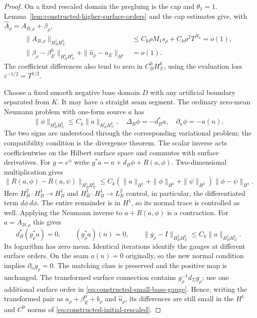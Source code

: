 \documentclass[11pt]{amsart}
\theoremstyle{definition}
\theoremstyle{remark}
\theoremstyle{plain}
\begin{document}
\begin{proof}
On a fixed rescaled domain the pregluing is the cap and $\theta_1=1$.
Lemma~\ref{lem:constructed-higher-surface-orders} and the cap estimates
give, with $\widehat A_\rho=A_{B,\rho}+\beta_\rho$,
\begin{equation}\label{eq:constructed-initial-rescaled}
 \begin{split}
 \|A_{B,\rho}\|_{H^1_BH^k_\Sigma}
       &\leq C_k\rho M_1s_\rho+C_k\rho^2T^{N_k}=o(1),\\
 \|\beta_\rho-\beta_E^0\|_{H^1_BH^k_\Sigma}
       +\|\widehat u_\rho-u_E\|_{H^1}&=o(1).
 \end{split}
\end{equation}
The coefficient differences also tend to zero in $C^0_BH^k_\Sigma$,
using the evaluation loss $\varepsilon^{-1/2}=T^{1/2}$.

Choose a fixed smooth negative base domain $D$ with any artificial
boundary separated from $K$. It may have a straight seam segment.
The ordinary zero-mean Neumann problem with one-form source $a$ has
\[
 \|\phi\|_{H^2_BH^k_\Sigma}\leq C_k\|a\|_{H^1_BH^k_\Sigma},
 \quad \Delta_B\phi=-d_B^*a,\quad \partial_n\phi=-a(n).
\]
The two signs are understood through the corresponding variational
problem; the compatibility condition is the divergence theorem. The
scalar inverse acts coefficientwise on the Hilbert surface space and
commutes with surface derivatives. For $g=e^\phi$ write
$g^*a=a+d_B\phi+R(a,\phi)$. Two-dimensional multiplication gives
\[
 \|R(a,\phi)-R(a,\psi)\|_{H^1_BH^k_\Sigma}
 \leq C_k(\|a\|_{H^1}+\|\phi\|_{H^2}+\|\psi\|_{H^2})
                                      \|\phi-\psi\|_{H^2}.
\]
Here $H^2_B\cdot H^1_B\to H^1_B$ and
$H^1_B\cdot H^1_B\to L^2_B$ control, in particular, the differentiated
term $d\phi\,d\phi$. The entire remainder is in $H^1$, so its normal
trace is controlled as well. Applying the Neumann inverse to
$a+R(a,\phi)$ is a contraction. For $a=A_{B,\rho}$ this gives
\begin{equation}\label{eq:constructed-small-base-gauge}
 d_B^*(g_\rho^*a)=0,\qquad (g_\rho^*a)(n)=0,\qquad
 \|g_\rho-I\|_{H^2_BH^k_\Sigma}\leq C_k\|a\|_{H^1_BH^k_\Sigma}.
\end{equation}
Its logarithm has zero mean. Identical iterations identify the gauges
at different surface orders. On the seam $a(n)=0$ originally, so the
new normal condition implies $\partial_ng_\rho=0$. The matching class
is preserved and the positive map is unchanged. The transformed surface
connection contains $g_\rho^{-1}d_\Sigma g_\rho$; use one additional
surface order in \eqref{eq:constructed-small-base-gauge}. Hence, writing
the transformed pair as $a_\rho+\beta_E^0+b_\rho$ and
$\widehat u_\rho$, its differences are still small in the $H^1$ and
$C^0$ norms of \eqref{eq:constructed-initial-rescaled}.


\end{proof}
\end{document}

